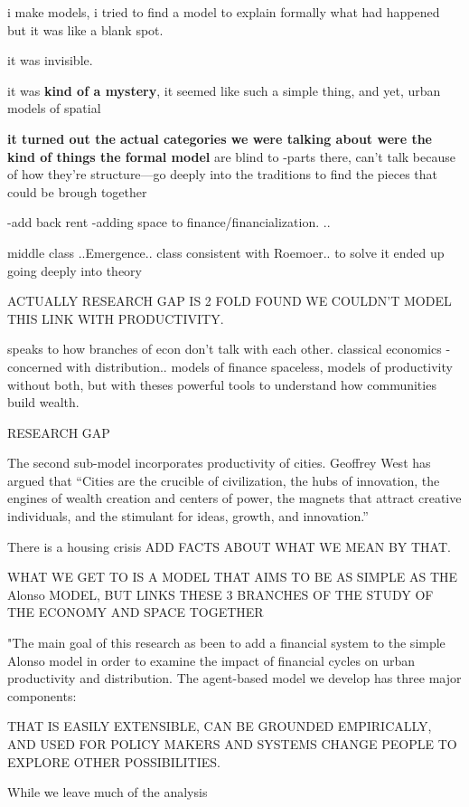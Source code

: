 i make models, i tried to find a model to explain formally what had happened
but it was like a blank spot. 

it was invisible. 

it was \textbf{kind of a mystery}, it seemed like such a simple thing, and yet, 
urban models of spatial 


\textbf{it turned out the actual categories we were talking about were the kind of things the formal model} are blind to
-parts there, can't talk because of how they're structure---go deeply into the traditions to find the pieces that could be brough together

-add back rent
-adding space to finance/financialization.
..


\gls{middle class}
..Emergence..
class consistent with Roemoer.. 
to solve it ended up going deeply into theory

ACTUALLY RESEARCH GAP IS 2 FOLD
FOUND WE COULDN'T MODEL THIS LINK WITH PRODUCTIVITY.


speaks to how branches of econ don't talk with each other. classical economics - concerned with distribution.. models of finance spaceless, models of productivity without both, but with theses powerful tools to understand how communities build wealth.


RESEARCH GAP

The second sub-model incorporates  productivity of cities. Geoffrey West has argued that ``Cities are the crucible of civilization, the hubs of innovation, the engines of wealth creation and centers of power, the magnets that attract creative individuals, and the stimulant for ideas, growth, and innovation.'' \cite{westScaleUniversalLaws2017} 


There is a housing crisis ADD FACTS ABOUT WHAT WE MEAN BY THAT.



WHAT WE GET TO IS A MODEL THAT AIMS TO BE AS SIMPLE AS THE Alonso MODEL, BUT LINKS THESE 3 BRANCHES OF THE STUDY OF THE ECONOMY AND SPACE TOGETHER

"The main goal of this research as been to add a financial system to the simple Alonso model in order to examine the impact of financial cycles on urban productivity and distribution. The \gls{agent-based model} we develop has three major components: 

THAT IS EASILY EXTENSIBLE, CAN BE GROUNDED EMPIRICALLY, AND USED FOR POLICY MAKERS AND SYSTEMS CHANGE PEOPLE TO EXPLORE OTHER POSSIBILITIES.


While we leave much of the analysis



